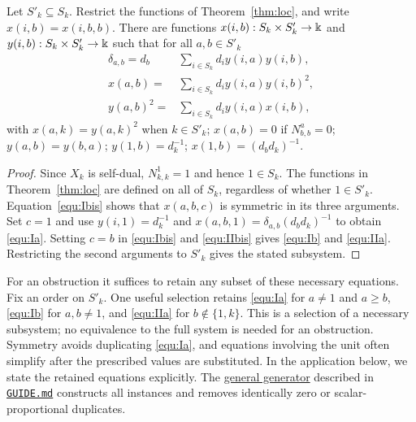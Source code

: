 \documentclass{amsart}
\begin{document}
\begin{corollary} \label{cor:loc}
Let $S'_k\subseteq S_k$. Restrict the functions of Theorem~\ref{thm:loc}, and write $x(i,b)=x(i,b,b)$. There are functions $x(i,b):S_k\times S_k' \to \Bbbk $ and $y(i,b):S_k\times S_k' \to \Bbbk$ such that for all $a,b \in S'_k$
\begin{align}
\label{equ:Ia}   \delta_{a,b} = d_b & \sum_{i \in S_k} d_i y(i,a)y(i,b), \\
\label{equ:Ib}   x(a,b) = & \sum_{i \in S_k} d_i y(i,a)y(i,b)^2,         \\
\label{equ:IIa} y(a,b)^2 = & \sum_{i \in S_k} d_i y(i,a)x(i,b),
\end{align}
with $x(a,k) = y(a,k)^2$ when $k\in S'_k$; $x(a,b) = 0$ if $N_{b,b}^a = 0$; $y(a,b) = y(b,a)$; $y(1,b) = d_k^{-1}$; $x(1,b) = (d_bd_k)^{-1}$.
\end{corollary}
\begin{proof}
Since $X_k$ is self-dual, $N_{k,k}^{1}=1$ and hence $1\in S_k$. The functions in Theorem~\ref{thm:loc} are defined on all of $S_k$, regardless of whether $1\in S'_k$. Equation~\eqref{equ:Ibis} shows that $x(a,b,c)$ is symmetric in its three arguments. Set $c=1$ and use $y(i,1)=d_k^{-1}$ and $x(a,b,1)=\delta_{a,b}(d_b d_k)^{-1}$ to obtain \eqref{equ:Ia}. Setting $c=b$ in \eqref{equ:Ibis} and \eqref{equ:IIbis} gives \eqref{equ:Ib} and \eqref{equ:IIa}. Restricting the second arguments to $S'_k$ gives the stated subsystem.
\end{proof}

\begin{remark}
For an obstruction it suffices to retain any subset of these necessary equations. Fix an order on $S'_k$. One useful selection retains \eqref{equ:Ia} for $a\ne1$ and $a\ge b$, \eqref{equ:Ib} for $a,b\ne1$, and \eqref{equ:IIa} for $b\notin\{1,k\}$. This is a selection of a necessary subsystem; no equivalence to the full system is needed for an obstruction. Symmetry avoids duplicating \eqref{equ:Ia}, and equations involving the unit often simplify after the prescribed values are substituted. In the application below, we state the retained equations explicitly. The \href{https://github.com/sebastienpalcoux/triangular-prism-categorification/blob/f816c697fde088b261e1fe1ce703980e5dbdab51/localization.py}{general generator} described in \href{https://github.com/sebastienpalcoux/triangular-prism-categorification/blob/f816c697fde088b261e1fe1ce703980e5dbdab51/GUIDE.md}{\texttt{GUIDE.md}} constructs all instances and removes identically zero or scalar-proportional duplicates.
\end{remark}
\end{document}
